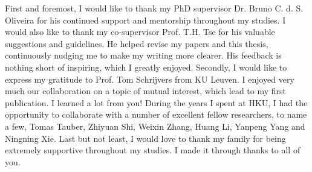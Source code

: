 
First and foremost, I would like to thank my PhD supervisor Dr. Bruno C. d. S.
Oliveira for his continued support and mentorship throughout my studies. I would
also like to thank my co-supervisor Prof. T.H. Tse for his valuable suggestions
and guidelines. He helped revise my papers and this thesis, continuously nudging
me to make my writing more clearer. His feedback is nothing short of inspiring,
which I greatly enjoyed. Secondly, I would like to express my gratitude to Prof.
Tom Schrijvers from KU Leuven. I enjoyed very much our collaboration on a topic
of mutual interest, which lead to my first publication. I learned a lot from
you! During the years I spent at HKU, I had the opportunity to collaborate with
a number of excellent fellow researchers, to name a few, Tomas Tauber, Zhiyuan
Shi, Weixin Zhang, Huang Li, Yanpeng Yang and Ningning Xie. Last but not least,
I would love to thank my family for being extremely supportive throughout my
studies. I made it through thanks to all of you.